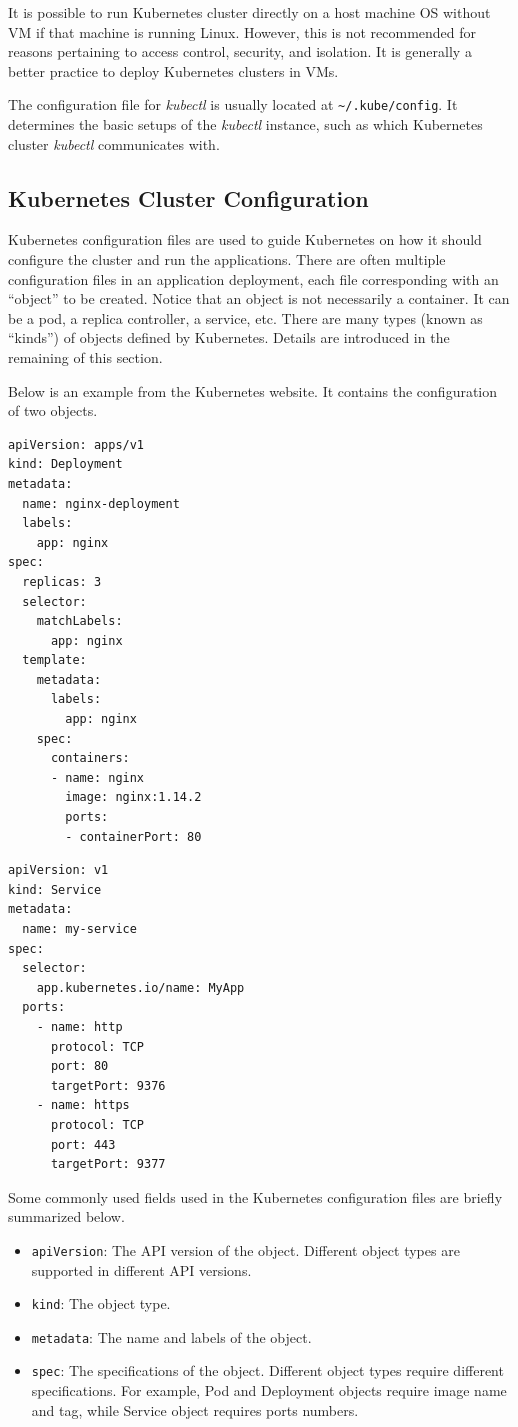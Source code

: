 It is possible to run Kubernetes cluster directly on a host machine OS without VM if that machine is running Linux. However, this is not recommended for reasons pertaining to access control, security, and isolation. It is generally a better practice to deploy Kubernetes clusters in VMs.

The configuration file for \textit{kubectl} is usually located at \verb|~/.kube/config|. It determines the basic setups of the \textit{kubectl} instance, such as which Kubernetes cluster \textit{kubectl} communicates with.

\subsection{Kubernetes Cluster Configuration}

Kubernetes configuration files are used to guide Kubernetes on how it should configure the cluster and run the applications. There are often multiple configuration files in an application deployment, each file corresponding with an ``object'' to be created. Notice that an object is not necessarily a container. It can be a pod, a replica controller, a service, etc. There are many types (known as ``kinds'') of objects defined by Kubernetes. Details are introduced in the remaining of this section.

Below is an example from the Kubernetes website. It contains the configuration of two objects.
\begin{lstlisting}
apiVersion: apps/v1
kind: Deployment
metadata:
  name: nginx-deployment
  labels:
    app: nginx
spec:
  replicas: 3
  selector:
    matchLabels:
      app: nginx
  template:
    metadata:
      labels:
        app: nginx
    spec:
      containers:
      - name: nginx
        image: nginx:1.14.2
        ports:
        - containerPort: 80
\end{lstlisting}

\begin{lstlisting}
apiVersion: v1
kind: Service
metadata:
  name: my-service
spec:
  selector:
    app.kubernetes.io/name: MyApp
  ports:
    - name: http
      protocol: TCP
      port: 80
      targetPort: 9376
    - name: https
      protocol: TCP
      port: 443
      targetPort: 9377
\end{lstlisting}

Some commonly used fields used in the Kubernetes configuration files are briefly summarized below.
\begin{itemize}
	\item \verb|apiVersion|: The API version of the object. Different object types are supported in different API versions.
	\item \verb|kind|: The object type.
	\item \verb|metadata|: The name and labels of the object. 
	\item \verb|spec|: The specifications of the object. Different object types require different specifications. For example, Pod and Deployment objects require image name and tag, while Service object requires ports numbers. 
\end{itemize}

